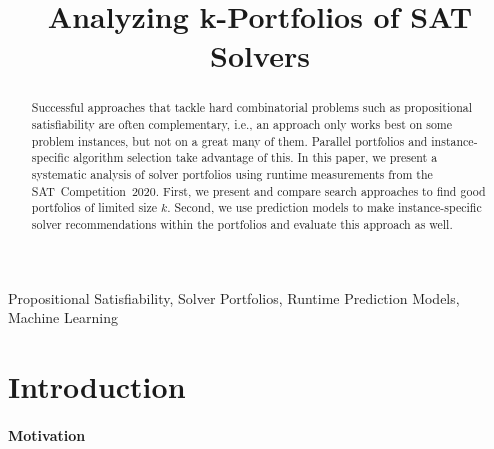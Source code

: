 \documentclass[conference]{IEEEtran}
\begin{document}
\title{Analyzing k-Portfolios of SAT Solvers}

\author{
\and
{}
}

\maketitle

\begin{abstract}
Successful approaches that tackle hard combinatorial problems such as propositional satisfiability are often complementary, i.e., an approach only works best on some problem instances, but not on a great many of them. 
Parallel portfolios and instance-specific algorithm selection take advantage of this. %
In this paper, we present a systematic analysis of solver portfolios using runtime measurements from the SAT~Competition~2020. %
First, we present and compare search approaches to find good portfolios of limited size $k$.
Second, we use prediction models to make instance-specific solver recommendations within the portfolios and evaluate this approach as well. %
\end{abstract}

\begin{IEEEkeywords}
Propositional Satisfiability, Solver Portfolios, Runtime Prediction Models, Machine Learning
\end{IEEEkeywords}

\section{Introduction}
\label{sec:introduction}

\paragraph{Motivation}
\end{document}
